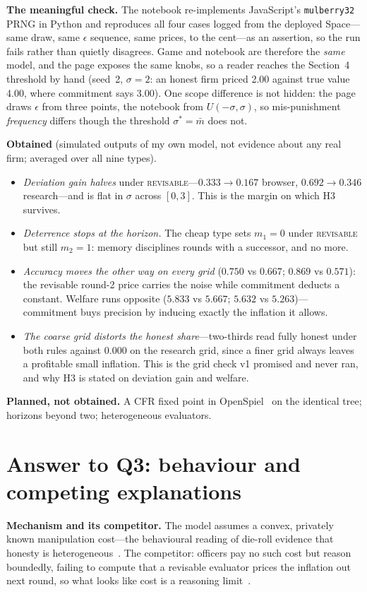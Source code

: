 \textbf{The meaningful check.} The notebook re-implements JavaScript's
\texttt{mulberry32} PRNG in Python and reproduces all four cases logged from the
deployed Space---same draw, same $\epsilon$ sequence, same prices, to the
cent---as an assertion, so the run fails rather than quietly disagrees. Game and
notebook are therefore the \emph{same} model, and the page exposes the same
knobs, so a reader reaches the Section~4 threshold by hand (seed~2, $\sigma=2$:
an honest firm priced 2.00 against true value 4.00, where commitment says 3.00).
One scope difference is not hidden: the page draws $\epsilon$ from three points,
the notebook from $U(-\sigma,\sigma)$, so mis-punishment \emph{frequency} differs
though the threshold $\sigma^{*}=\bar m$ does not.

\textbf{Obtained} (simulated outputs of my own model, not evidence about any real
firm; averaged over all nine types).
\begin{itemize}
\item \emph{Deviation gain halves} under \textsc{revisable}---$0.333\to0.167$
browser, $0.692\to0.346$ research---and is flat in $\sigma$ across $[0,3]$. This
is the margin on which H3 survives.
\item \emph{Deterrence stops at the horizon.} The cheap type sets $m_1=0$ under
\textsc{revisable} but still $m_2=1$: memory disciplines rounds with a
successor, and no more.
\item \emph{Accuracy moves the other way on every grid} ($0.750$ vs $0.667$;
$0.869$ vs $0.571$): the revisable round-2 price carries the noise while
commitment deducts a constant. Welfare runs opposite ($5.833$ vs $5.667$;
$5.632$ vs $5.263$)---commitment buys precision by inducing exactly the
inflation it allows.
\item \emph{The coarse grid distorts the honest share}---two-thirds read fully
honest under both rules against $0.000$ on the research grid, since a finer grid
always leaves a profitable small inflation. This is the grid check v1 promised
and never ran, and why H3 is stated on deviation gain and welfare.
\end{itemize}

\textbf{Planned, not obtained.} A CFR fixed point in
OpenSpiel~\cite{lanctot2019} on the identical tree; horizons beyond two;
heterogeneous evaluators.

\section{Answer to Q3: behaviour and competing explanations}
\textbf{Mechanism and its competitor.} The model assumes a convex, privately
known manipulation cost---the behavioural reading of die-roll evidence that
honesty is heterogeneous~\cite{fischbacher2013}. The competitor: officers pay no
such cost but reason boundedly, failing to compute that a revisable evaluator
prices the inflation out next round, so what looks like cost is a reasoning
limit~\cite{wright2020}.

